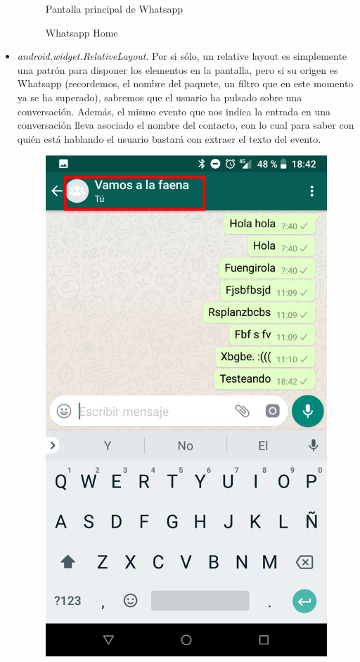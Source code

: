 \documentclass[12pt,a4paper,oneside]{book} %
\begin{document}
\begin{itemize}
\begin{figure}[H]
\begin{center}
	    	\caption{Whatsapp Home}{Pantalla principal de Whatsapp}
    	\label{fig:Whatsapp Home}
	\end{center}
\end{figure}

\item \textit{android.widget.RelativeLayout}. Por si sólo, un relative layout es simplemente una patrón para disponer los elementos en la pantalla, pero si su origen es Whatsapp (recordemos, el nombre del paquete, un filtro que en este momento ya se ha superado), sabremos que el usuario ha pulsado sobre una conversación. 
\newline \newline 
Además, el mismo evento que nos indica la entrada en una conversación lleva asociado el nombre del contacto, con lo cual para saber con quién está hablando el usuario bastará con extraer el texto del evento. 
\begin{figure}[H]
	\begin{center}
     	\includegraphics[scale=0.15]{pictures/IRL/whatsapp/whatsapp_layout.png}

\end{center}
\end{figure}
\end{itemize}
\end{document}
